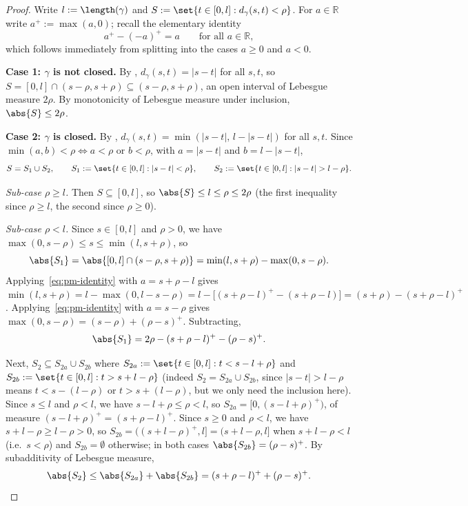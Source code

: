 \begin{proof}
  Write $l := \length(\gamma)$ and $S := \set{t \in [0,l] : d_\gamma(s,t) < \rho}$. For $a \in
  \mathbb{R}$ write $a^+ := \max(a,0)$; recall the elementary identity
  \begin{equation}
    \label{eq:pm-identity}
    a^+ - (-a)^+ = a \qquad \text{for all } a \in \mathbb{R}
    ,
  \end{equation}
  which follows immediately from splitting into the cases $a \geq 0$ and $a < 0$.

  \textbf{Case 1: $\gamma$ is not closed.} By , $d_\gamma(s,t) = |s-t|$ for all
  $s,t$, so $S = [0,l] \cap (s-\rho,s+\rho) \subseteq (s-\rho,s+\rho)$, an open interval of Lebesgue
  measure $2\rho$. By monotonicity of Lebesgue measure under inclusion, $\abs{S} \leq 2\rho$.

  \textbf{Case 2: $\gamma$ is closed.} By , $d_\gamma(s,t) = \min(|s-t|,\, l -
  |s-t|)$ for all $s,t$. Since $\min(a,b) < \rho \iff a<\rho \text{ or } b<\rho$, with $a=|s-t|$
  and $b = l - |s-t|$,
  \[
    S = S_1 \cup S_2
    , \qquad
    S_1 := \set{t \in [0,l] : |s-t| < \rho}
    , \qquad
    S_2 := \set{t \in [0,l] : |s-t| > l - \rho}
    .
  \]

  \emph{Sub-case $\rho \geq l$.} Then $S \subseteq [0,l]$, so $\abs{S} \leq l \leq \rho \leq 2\rho$
  (the first inequality since $\rho \geq l$, the second since $\rho \geq 0$).

  \emph{Sub-case $\rho < l$.} Since $s \in [0,l]$ and $\rho > 0$, we have $\max(0,s-\rho) \leq s
  \leq \min(l,s+\rho)$, so
  \[
    \abs{S_1} = \abs{[0,l] \cap (s-\rho,s+\rho)} = \min(l,s+\rho) - \max(0,s-\rho)
    .
  \]
  Applying~\eqref{eq:pm-identity} with $a = s+\rho-l$ gives $\min(l,s+\rho) = l -
  \max(0,l-s-\rho) = l - \bigl[(s+\rho-l)^+ - (s+\rho-l)\bigr] = (s+\rho) - (s+\rho-l)^+$.
  Applying~\eqref{eq:pm-identity} with $a = s - \rho$ gives $\max(0,s-\rho) = (s-\rho) +
  (\rho-s)^+$. Subtracting,
  \begin{equation}
    \label{eq:pm-S1}
    \abs{S_1} = 2\rho - (s+\rho-l)^+ - (\rho-s)^+
    .
  \end{equation}

  Next, $S_2 \subseteq S_{2a} \cup S_{2b}$ where $S_{2a} := \set{t \in [0,l] : t < s-l+\rho}$ and
  $S_{2b} := \set{t \in [0,l] : t > s+l-\rho}$ (indeed $S_2 = S_{2a}\cup S_{2b}$, since $|s-t|>l-\rho$
  means $t < s-(l-\rho)$ or $t > s+(l-\rho)$, but we only need the inclusion here). Since $s \leq l$
  and $\rho < l$, we have $s - l + \rho \leq \rho < l$, so $S_{2a} = [0, (s-l+\rho)^+)$, of measure
  $(s-l+\rho)^+ = (s+\rho-l)^+$. Since $s \geq 0$ and $\rho < l$, we have $s+l-\rho \geq l-\rho > 0$,
  so $S_{2b} = ((s+l-\rho)^+, l] = (s+l-\rho,l]$ when $s + l - \rho < l$ (i.e.\ $s<\rho$) and
  $S_{2b}=\emptyset$ otherwise; in both cases $\abs{S_{2b}} = (\rho-s)^+$. By subadditivity of
  Lebesgue measure,
  \begin{equation}
    \label{eq:pm-S2}
    \abs{S_2} \leq \abs{S_{2a}} + \abs{S_{2b}} = (s+\rho-l)^+ + (\rho-s)^+
    .
  \end{equation}


\end{proof}
